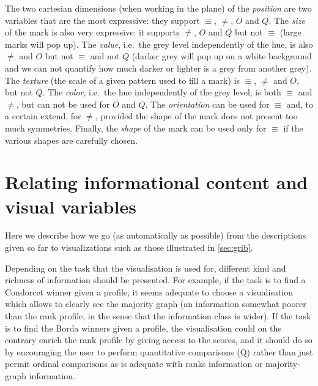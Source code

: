 \documentclass[version=last, pagesize, twoside=off, bibliography=totoc, DIV=calc, fontsize=12pt, a4paper, french, english]{scrartcl}
\begin{document}
The two cartesian dimensions (when working in the plane) of the \emph{position} are two variables that are the most expressive: they support $\equiv$, $\neq$, $O$ and $Q$.
The \emph{size} of the mark is also very expressive: it supports $\neq$, $O$ and $Q$ but not $\equiv$ (large marks will pop up).
The \emph{value}, i.e.\ the grey level independently of the hue, is also $\neq$ and $O$ but not $\equiv$ and not $Q$ (darker grey will pop up on a white background and we can not quantify how much darker or lighter is a grey from another grey).
The \emph{texture} (the scale of a given pattern used to fill a mark) is $\equiv$, $\neq$ and $O$, but not $Q$.
The \emph{color}, i.e.\ the hue independently of the grey level, is both $\equiv$ and $\neq$, but can not be used for $O$ and $Q$.
The \emph{orientation} can be used for $\equiv$ and, to a certain extend, for $\neq$, provided the shape of the mark does not present too much symmetries.
Finally, the \emph{shape} of the mark can be used only for $\equiv$ if the various shapes are carefully chosen.

\section{Relating informational content and visual variables}
Here we describe how we go (as automatically as possible) from the descriptions given so far to visualizations such as those illustrated in \cref{sec:grib}.

Depending on the task that the visualisation is used for, different kind and richness of information should be presented. For example, if the task is to find a Condorcet winner given a profile, it seems adequate to choose a visualisation which allows to clearly see the majority graph (an information somewhat poorer than the rank profile, in the sense that the information class is wider). If the task is to find the Borda winners given a profile, the visualisation could on the contrary enrich the rank profile by giving access to the scores, and it should do so by encouraging the user to perform quantitative comparisons (Q) rather than just permit ordinal comparisons as is adequate with ranks information or majority-graph information.
\end{document}
